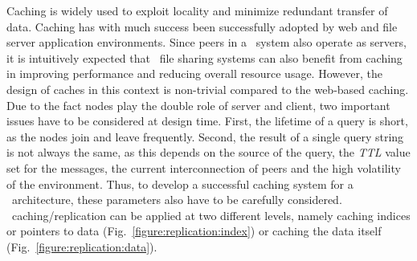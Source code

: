 Caching is widely used to exploit locality and minimize redundant
transfer of data. Caching has with much success been successfully 
adopted by web and file server application environments. 
Since peers in a \p\ system also operate as servers,
it is intuitively expected that \p\ file sharing systems can also benefit from
caching in improving performance and reducing overall resource usage. 
However, the design of caches in this context 
is non-trivial compared to the web-based caching. 
Due to the fact nodes play the double role of server and client,
two important issues have to be considered at design time. 
First, the lifetime of a query is short, as the nodes join 
and leave frequently. Second, the result
of a single query string is not always the same, as this depends on the
source of the query, the \emph{TTL} value set for the messages, 
the current interconnection of peers and the 
high volatility of the environment. 
Thus, to develop a successful caching system for a \p\ architecture, these
parameters also have to be carefully considered. 
\p\ caching/replication can be applied
at two different levels, namely caching indices or pointers to data 
(Fig.~\ref{figure:replication:index}) or caching the data itself 
(Fig.~\ref{figure:replication:data}). 
